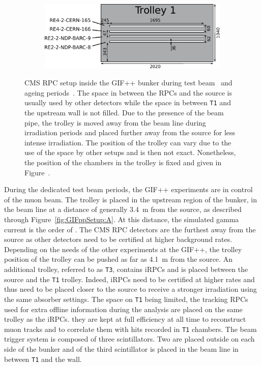 \begin{figure}[H]
\begin{subfigure}{0.5\linewidth}
    	\end{subfigure}
    	\begin{subfigure}{\linewidth}
    		\vspace*{5mm}
			\centering
    		\includegraphics[width = 0.8\plotwidth]{fig/chapt5/GIFpp-T1.pdf}
        	\caption{\label{fig:GIFppSetup:C}}
    	\end{subfigure}
		\caption{\label{fig:GIFppSetup} CMS RPC setup inside the GIF++ bunker during test beam~ and ageing periods~. The space in between the RPCs and the source is usually used by other detectors while the space in between \texttt{T1} and the upstream wall is not filled. Due to the presence of the beam pipe, the trolley is moved away from the beam line during irradiation periods and placed further away from the source for less intense irradiation. The position of the trolley can vary due to the use of the space by other setups and is then not exact. Nonetheless, the position of the chambers in the trolley is fixed and given in Figure~.}
	\end{figure}
	
	During the dedicated test beam periods, the GIF++ experiments are in control of the muon beam. The trolley is placed in the upstream region of the bunker, in the beam line at a distance of generally \SI{3.4}{m} from the source, as described through Figure~\ref{fig:GIFppSetup:A}. At this distance, the simulated gamma current is the order of  \siflux. The CMS RPC detectors are the furthest away from the source as other detectors need to be certified at higher background rates. Depending on the needs of the other experiments at the GIF++, the trolley position of the trolley can be pushed as far as \SI{4.1}{m} from the source. An additional trolley, referred to as \texttt{T3}, contains iRPCs and is placed between the source and the \texttt{T1} trolley. Indeed, iRPCs need to be certified at higher rates and thus need to be placed closer to the source to receive a stronger irradiation using the same absorber settings. The space on \texttt{T1} being limited, the tracking RPCs used for extra offline information during the analysis are placed on the same trolley as the iRPCs. they are kept at full efficiency at all time to reconstruct muon tracks and to correlate them with hits recorded in \texttt{T1} chambers. The beam trigger system is composed of three scintillators. Two are placed outside on each side of the bunker and of the third scintillator is placed in the beam line in between \texttt{T1} and the wall.
	
